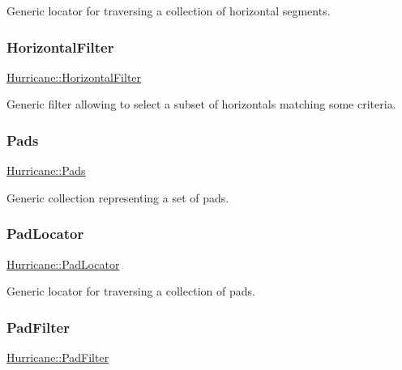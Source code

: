 Generic locator for traversing a collection of horizontal segments. \mbox{\label{namespaceHurricane_a56eb48037c2e1295fafe761bf179bf01}} 
\subsubsection{\texorpdfstring{Horizontal\+Filter}{HorizontalFilter}}
{\footnotesize\ttfamily \hyperlink{namespaceHurricane_a56eb48037c2e1295fafe761bf179bf01}{Hurricane\+::\+Horizontal\+Filter}}

Generic filter allowing to select a subset of horizontals matching some criteria. \mbox{\label{namespaceHurricane_abd1f433c44d8b515e1b8a8810aea1610}} 
\subsubsection{\texorpdfstring{Pads}{Pads}}
{\footnotesize\ttfamily \hyperlink{namespaceHurricane_abd1f433c44d8b515e1b8a8810aea1610}{Hurricane\+::\+Pads}}

Generic collection representing a set of pads. \mbox{\label{namespaceHurricane_a733c2eb75cde14a8b6a2e62edfbd2792}} 
\subsubsection{\texorpdfstring{Pad\+Locator}{PadLocator}}
{\footnotesize\ttfamily \hyperlink{namespaceHurricane_a733c2eb75cde14a8b6a2e62edfbd2792}{Hurricane\+::\+Pad\+Locator}}

Generic locator for traversing a collection of pads. \mbox{\label{namespaceHurricane_aeff6d8148675fc30f366906bfc652c25}} 
\subsubsection{\texorpdfstring{Pad\+Filter}{PadFilter}}
{\footnotesize\ttfamily \hyperlink{namespaceHurricane_aeff6d8148675fc30f366906bfc652c25}{Hurricane\+::\+Pad\+Filter}}

